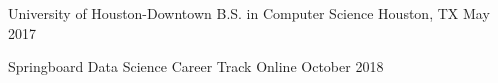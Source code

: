 

\begin{cventries}
	
	\cventryschool
	{University of Houston-Downtown} %
	{B.S. in Computer Science} %
	{Houston, TX} %
	{May 2017} %
	{
		\begin{cvitems} %
			\item {}
		\end{cvitems}
	}
	
	
	\cventryschool
	{Springboard} %
	{Data Science Career Track} %
	{Online} %
	{October 2018} %
	{
		\begin{cvitems} %
			\item {}
		\end{cvitems}
	}
	\vspace*{-6mm}
\end{cventries}
